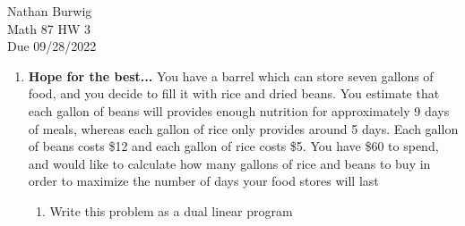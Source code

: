 \documentclass[11pt]{article}
\begin{document}
\noindent Nathan Burwig \\
Math 87 HW 3 \\
Due 09/28/2022 

\hrulefill

\begin{enumerate}



\item \textbf{Hope for the best...}
    You have a barrel which can store seven gallons of food, and you decide
    to fill it with rice and dried beans. You estimate that each gallon of 
    beans will provides enough nutrition for approximately 9 days of meals, 
    whereas each gallon of rice only provides around 5 days. Each gallon of 
    beans costs \$12 and each gallon of rice costs \$5. You have \$60 to spend,
    and would like to calculate how many gallons of rice and beans to buy in 
    order to maximize the number of days your food stores will last
\begin{enumerate}
    
    \item Write this problem as a dual linear program


\end{enumerate}
\end{enumerate}
\end{document}
